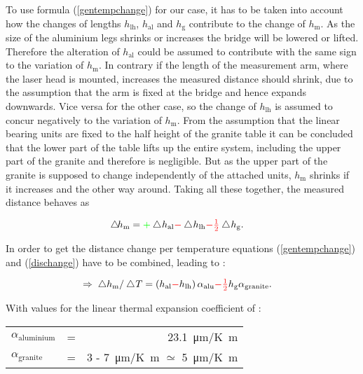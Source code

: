 \documentclass[
a4paper,                                %
twoside,                                %
BCOR1.4cm,                      %
10pt,                           %
headings=normal,                %
headsepline,                    %
clearplainpage, %
final,                                  %
div=14,
parskip=full,
openright,
bibliography=toc
]{scrreprt}
\begin{document}
To use formula (\ref{gentempchange}) for our case, it has to be taken into account how the changes of lengths $h_{\mathrm{lh}}$, $h_{\mathrm{al}}$ and $h_{\mathrm{g}}$ contribute to the change of $h_{\mathrm{m}}$. As the size of the aluminium legs shrinks or increases the bridge will be lowered or lifted. Therefore the alteration of $h_{\mathrm{al}}$ could be assumed to contribute with the same sign to the variation of $h_{\mathrm{m}}$. In contrary if the length of the measurement arm, where the laser head is mounted, increases the measured distance should shrink, due to the assumption that the arm is fixed at the bridge and hence expands downwards. Vice versa for the other case, so the change of $h_{\mathrm{lh}}$ is assumed to concur negatively to the variation of $h_{\mathrm{m}}$. From the assumption that the linear bearing units are fixed to the half height of the granite table it can be concluded that the lower part of the table lifts up the entire system, including the upper part of the granite and therefore is negligible. But as the upper part of the granite is supposed to change independently of the attached units, $h_{\mathrm{m}}$ shrinks if it increases and the other way around. Taking all these together, the measured distance behaves as

\begin{align}
	\bigtriangleup\!h_{\mathrm{m}} &= {\color{green}+} \bigtriangleup\!h_{\mathrm{al}} {\color{red}-} \bigtriangleup\!h_{\mathrm{lh}} {\color{red}- \tfrac{1}{2}} \bigtriangleup\!h_{\mathrm{g}}. 
	\label{dischange}
\end{align}

In order to get the distance change per temperature equations (\ref{gentempchange}) and (\ref{dischange}) have to be combined, leading to : 

\begin{align}
	\Rightarrow \; \bigtriangleup h_{\mathrm{m}} /\bigtriangleup\!T &= \left( h_{\mathrm{al}} {\color{red}-} h_{\mathrm{lh}} \right)  \alpha_{\mathrm{alu}} {\color{red}- \tfrac{1}{2}} h_{\mathrm{g}} \alpha_{\mathrm{granite}}.
\end{align}

With values for the linear thermal expansion coefficient of : 

\begin{table}[H]
\centering	 
\begin{tabular}{lcr}
	$\alpha_{\mathrm{aluminium}}$ & = & \SI{23.1}{\micro\m/\K\m}
	\\
	$\alpha_{\mathrm{granite}}$ & = & 3 - \SI{7}{\micro\m/\K\m} $\simeq$ \SI{5}{\micro\m/\K\m}
\end{tabular}
\end{table}
\end{document}

